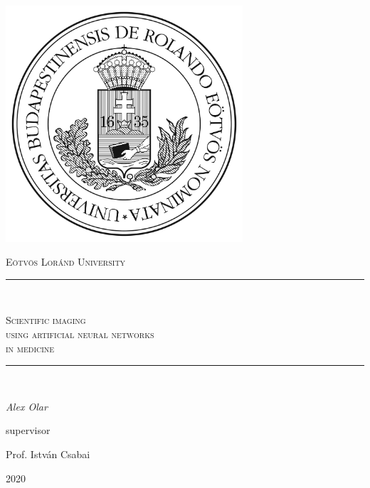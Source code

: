 \documentclass[a4paper,12pt]{article}
\begin{document}
\linespread{1.5}

\begin{titlepage}

    \centering
    \includegraphics[width=0.66\textwidth]{elte.jpg}\par\vspace{1cm}
    {\scshape\LARGE Eötvös Loránd University \par}
    \vspace{1cm}
    \rule{140mm}{0.1mm}\\
    \vspace{.5cm}
    {\scshape\Large Scientific imaging \\ using artificial neural networks \\ in medicine\par}
    \vspace{.5cm}
    \rule{140mm}{0.1mm}\\
    \vspace{.5cm}
    {\large\itshape Alex Olar\par}
    \vfill
    supervisor\par
    \vspace{0.5cm}
    {\Large Prof. István Csabai}

    \vfill
    
    {\large 2020 \par}
\end{titlepage}
\end{document}

